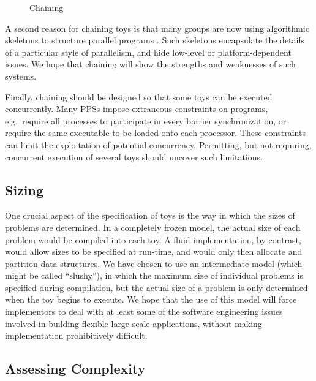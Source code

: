 \begin{figure}
\epsfxsize=12cm
\begin{center}\mbox{}\end{center}
\caption{Chaining\label{f:chaining}}
\end{figure}

A second reason for chaining toys is that
many groups are now using algorithmic skeletons to structure parallel programs
\cite{b:cole-skel,b:p3l-overview,b:enterprise}.
Such skeletons encapsulate the details of a particular style of parallelism,
and hide low-level or platform-dependent issues.
We hope that chaining will show the strengths and weaknesses of such systems.

Finally,
chaining should be designed so that some toys can be executed concurrently.
Many PPSs impose extraneous constraints on programs,
e.g.\ require all processes to participate in every barrier synchronization,
or require the same executable to be loaded onto each processor.
These constraints can limit the exploitation of potential concurrency.
Permitting, but not requiring, concurrent execution of several toys should uncover such limitations.

\subsection{Sizing\label{s:method-size}}

One crucial aspect of the specification of toys is
the way in which the sizes of problems are determined.
In a completely frozen model, the actual size of each problem would be compiled into each toy.
A fluid implementation, by contrast, would allow sizes to be specified at run-time,
and would only then allocate and partition data structures.
We have chosen to use an intermediate model (which might be called ``slushy''),
in which the maximum size of individual problems is specified during compilation,
but the actual size of a problem is only determined when the toy begins to execute.
We hope that the use of this model will force implementors to deal with
at least some of the software engineering issues
involved in building flexible large-scale applications,
without making implementation prohibitively difficult.

\subsection{Assessing Complexity\label{s:method-complex}}

